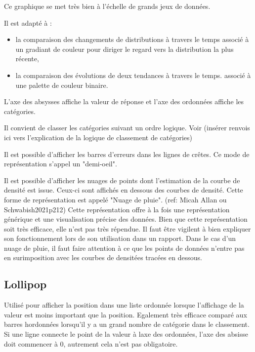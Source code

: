 \documentclass[a4paper,12pt]{article}
\begin{document}
\begin{multicols}{2}
Ce graphique se met très bien à l'échelle de grands jeux de données. \autocite{wilkeVisualizingManyDistributions2019}

Il est adapté à :
\begin{itemize}
\item la comparaison des changements de distributions à travers le temps \autocite{wilkeDirectoryVisualizations2019} associé à un gradiant de couleur pour diriger le regard vers la distribution la plus récente, \autocite{jonathanschwabishDistribution2021}
\item la comparaison des évolutions de deux tendances à travers le temps. \autocite{wilkeVisualizingManyDistributions2019} associé à une palette de couleur binaire.
\end{itemize}

L'axe des absysses affiche la valeur de réponse et l'axe des ordonnées affiche les catégories. \autocite{wilkeVisualizingManyDistributions2019}

Il convient de classer les catégories suivant un ordre logique. \autocite{jonathanschwabishDistribution2021} Voir (insérer renvois ici vers l'explication de la logique de classement de catégories)

Il est possible d'afficher les barres d'erreurs dans les lignes de crêtes. Ce mode de représentation s'appel un "demi-oeil". \autocite{wilkeVisualizingUncertainty2019}

Il est possible d'afficher les nuages de points dont l'estimation de la courbe de densité est issue. Ceux-ci sont affichés en dessous des courbes de densité. Cette forme de représentation est appelé "Nuage de pluie". (ref: Micah Allan ou Schwabish2021p212) Cette représentation offre à la fois une représentation générique et une visualisation précise des données. \autocite{jonathanschwabishDistribution2021} Bien que cette représentation soit très efficace, elle n'est pas très répendue. \autocite{jonathanschwabishDistribution2021} Il faut être vigilent à bien expliquer son fonctionnement lors de son utilisation dans un rapport. Dans le cas d'un nuage de pluie, il faut faire attention à ce que les points de données n'entre pas en surimposition avec les courbes de densitées tracées en dessous.
\subsection*{Lollipop}
\label{sec:org50586c9}
Utilisé pour afficher la position dans une liste ordonnée lorsque l'affichage de la valeur est moins important que la position. \autocite{alansmithLexiqueVisuel} Egalement très efficace comparé aux barres hordonnées lorsqu'il y a un grand nombre de catégorie dans le classement. \autocite{mikeyiHowChooseRight2020}  Si une ligne connecte le point de la valeur à laxe des ordonnées, l'axe des absisse doit commencer à 0, autrement cela n'est pas obligatoire.

\end{multicols}
\end{document}

